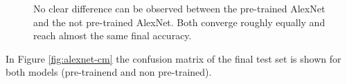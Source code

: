 \begin{figure}[h]
\centering
\caption{No clear difference can be observed between the pre-trained AlexNet and the not pre-trained AlexNet. Both converge roughly equally and reach almost the same final accuracy.}
\label{fig:alexnet-graph}
\end{figure}

In Figure \ref{fig:alexnet-cm} the confusion matrix of the final test set is shown for both models (pre-trainend and non pre-trained). 

